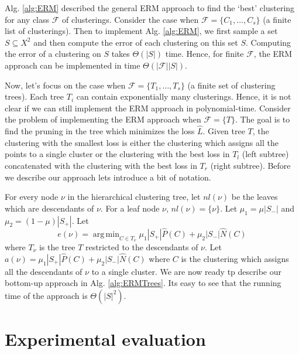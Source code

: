 \documentclass[12pt]{article}
\newcommand{\mc}{\mathcal}
\DeclareMathOperator*{\argmin}{arg\,min}
\begin{document}
Alg. \ref{alg:ERM} described the general ERM approach to find the `best' clustering for any class $\mc F$ of clusterings. Consider the case when $\mc F = \{C_1, \ldots, C_s\}$ (a finite list of clusterings). Then to implement Alg. \ref{alg:ERM}, we first sample a set $S \subseteq X^2$ and then compute the error of each clustering on this set $S$. Computing the error of a clustering on $S$ takes $\Theta(|S|)$ time. Hence, for finite $\mc F$, the ERM approach can be implemented in time $\Theta(|\mc F| |S|)$. 

Now, let's focus on the case when $\mc F = \{T_1, \ldots, T_s\}$ (a finite set of clustering trees). Each tree $T_i$ can contain exponentially many clusterings. Hence, it is not clear if we can still implement the ERM approach in polynomial-time. Consider the problem of implementing the ERM approach when $\mc F = \{T\}$. The goal is to find the pruning in the tree which minimizes the loss $\hat L$. Given tree $T$, the clustering with the smallest loss is either the clustering which assigns all the points to a single cluster or the clustering with the best loss in $T_l$ (left subtree) concatenated with the clustering with the best loss in $T_r$ (right subtree). Before we describe our approach lets introduce a bit of notation.

For every node $\nu$ in the hierarchical clustering tree, let $nl(\nu)$ be the leaves which are descendants of $\nu$. For a leaf node $\nu$, $nl(\nu) = \{\nu\}$. Let $\mu_1 = \mu|S_-|$ and $\mu_2 = (1-\mu)|S_+|$. Let $$e(\nu) = \argmin_{C \in T_{\nu}} \mu_1|S_+|\hat P(C) + \mu_2|S_-|\hat N(C)$$ where $T_{\nu}$ is the tree $T$ restricted to the descendants of $\nu$. Let $a(\nu) = \mu_1|S_+|\hat P(C) + \mu_2|S_-|\hat N(C)$ where $C$ is the clustering which assigns all the descendants of $\nu$ to a single cluster. We are now ready tp describe our bottom-up approach in Alg. \ref{alg:ERMTrees}. Its easy to see that the running time of the approach is $\Theta(|S|^2)$. 

\section{Experimental evaluation}
\label{sec:evaluation}
\end{document}
